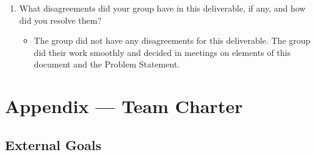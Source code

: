 \documentclass{article}
\begin{document}
{\begin{enumerate}
\begin{itemize}
    complex, and it may require additional resources and infrastructure to 
    maintain.
		\item Hussain: CI/CD has many advantages. Having an effective CI/CD 
    pipeline set up allows for faster development and deployment of 
    code as it automates many of the tasks that would be done manually. 
    This allows developers to focus on more complex tasks of the project. 
    The disadvantages of CI/CD are that it can be difficult to 
    initially set u,p as developers may not know what is to be 
    automated and what is not. It can also become difficult 
    to fix constantly breaking pipelines if the 
    code is not properly reviewed.
		\item Kevin: The advantages of CI/CD are that if any issues arise with 
        the project, as it is constantly being deployed, these issues can be 
        found and fixed quickly. This prevents said issues from propagating, 
        causing other issues that make the project bad.
		
		The disadvantage is that it can require proper planning and is more 
        costly in terms of time and money. This is because each development must 
        be vetted (requires time and money) before development can continue, 
        slowing down project development. 

	\end{itemize}
    \item What disagreements did your group have in this deliverable, if any,
    and how did you resolve them?
    
   \begin{itemize}
		\item The group did not have any disagreements for this deliverable. 
        The group did their work smoothly and decided in meetings on elements 
        of this document and the Problem Statement.
	\end{itemize}
\end{enumerate}

\newpage{}

\section*{Appendix --- Team Charter}


\subsection*{External Goals}

}
\end{document}

